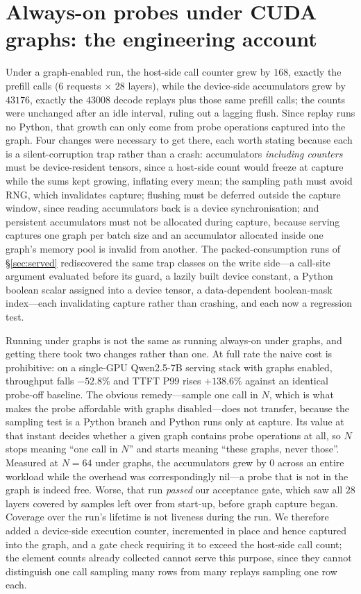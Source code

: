 \documentclass[11pt]{article}
\begin{document}
\section{Always-on probes under CUDA graphs: the engineering account}
\label{app:overhead}
Under a
graph-enabled run, the host-side call counter grew by $168$, exactly the
prefill calls ($6$ requests $\times$ $28$ layers), while the device-side
accumulators grew by $43176$, exactly the $43008$ decode replays plus those
same prefill calls; the counts were unchanged after an idle interval, ruling out a
lagging flush. Since replay runs no Python, that growth can only come from probe
operations captured into the graph. Four changes were necessary to get there, each
worth stating because each is a silent-corruption trap rather than a crash:
accumulators \emph{including counters} must be device-resident tensors, since a
host-side count would freeze at capture while the sums kept growing, inflating every
mean; the sampling path must avoid RNG, which invalidates capture; flushing must be
deferred outside the capture window, since reading accumulators back is a device
synchronisation; and persistent accumulators must not be allocated during capture,
because serving captures one graph per batch size and an accumulator allocated inside
one graph's memory pool is invalid from another. The packed-consumption
runs of \S\ref{sec:served} rediscovered the same trap classes on the write
side---a call-site argument evaluated before its guard, a lazily built
device constant, a Python boolean scalar assigned into a device tensor, a
data-dependent boolean-mask index---each invalidating capture rather than
crashing, and each now a regression test.

Running under graphs is not the same as running always-on under graphs, and getting
there took two changes rather than one. At full rate the naive cost is prohibitive: on
a single-GPU Qwen2.5-7B serving stack with graphs enabled, throughput falls
$-52.8\%$ and TTFT P99 rises $+138.6\%$ against an identical probe-off
baseline. The obvious remedy---sample one call in $N$, which is what makes the probe
affordable with graphs disabled---does not transfer, because the sampling test is a
Python branch and Python runs only at capture. Its value at that instant decides
whether a given graph contains probe operations at all, so $N$ stops meaning ``one
call in $N$'' and starts meaning ``these graphs, never those''. Measured at $N=64$
under graphs, the accumulators grew by $0$ across an entire workload while the
overhead was correspondingly nil---a probe that is not in the graph is indeed free.
Worse, that run \emph{passed} our acceptance gate, which saw all $28$ layers covered
by samples left over from start-up, before graph capture began. Coverage over the
run's lifetime is not liveness during the run. We therefore added a device-side
execution counter, incremented in place and hence captured into the graph, and a gate
check requiring it to exceed the host-side call count; the element counts already
collected cannot serve this purpose, since they cannot distinguish one call sampling
many rows from many replays sampling one row each.
\end{document}
